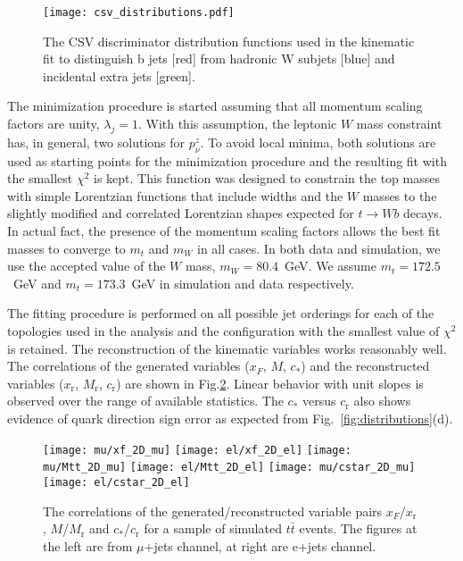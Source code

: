 \documentclass{cmspaperpdf}
\begin{document}
\begin{figure}[hbt]
  \begin{center}
    \texttt{[image: csv\_distributions.pdf]}
  \caption{\small The CSV discriminator distribution functions used in the kinematic fit to distinguish b jets [red] from hadronic W subjets [blue] and incidental extra jets [green].}
    \label{fig:CSV_distributions}
  \end{center}
\end{figure}

The minimization procedure is started assuming that all momentum scaling factors are unity, $\lambda_j=1$.  With this assumption, the leptonic $W$ mass constraint has, in general, two solutions for $p_\nu^z$.  To avoid local minima, both solutions are used as starting points for the minimization procedure and the resulting fit with the smallest $\chi^2$ is kept.  This function was designed to constrain the top masses with simple Lorentzian functions that include widths and the $W$ masses to the slightly modified and correlated Lorentzian shapes expected for $t\to Wb$ decays.  In actual fact, the presence of the momentum scaling factors allows the best fit masses to converge to $m_t$ and $m_W$ in all cases. In both data and simulation, we use the accepted value of the $W$ mass, $m_W = 80.4$~GeV. We assume $m_t=172.5$~GeV and $m_t=173.3$~GeV in simulation and data respectively.

The fitting procedure is performed on all possible jet orderings for each of the topologies used in the analysis and the configuration with the smallest value of $\chi^2$ is retained.  The reconstruction of the kinematic variables works reasonably well.  The correlations of the generated variables ($x_F$, $M$, $c_*$) and the reconstructed variables ($x_\mathrm{r}$, $M_\mathrm{r}$, $c_\mathrm{r}$) are shown in Fig.\ref{fig:cost_reco}.  Linear behavior with unit slopes is observed over the range of available statistics.  The $c_*$ versus $c_\mathrm{r}$ also shows evidence of quark direction sign error as expected from Fig.~\ref{fig:distributions}(d).  

\begin{figure}[hbt]
  \begin{center}
    \texttt{[image: mu/xf\_2D\_mu]}
    \texttt{[image: el/xf\_2D\_el]}   
    \texttt{[image: mu/Mtt\_2D\_mu]}
    \texttt{[image: el/Mtt\_2D\_el]}
    \texttt{[image: mu/cstar\_2D\_mu]}
    \texttt{[image: el/cstar\_2D\_el]}
  \caption{\small The correlations of the generated/reconstructed variable pairs $x_F$/$x_\mathrm{r}$ , $M$/$M_\mathrm{r}$ and $c_*$/$c_\mathrm{r}$ for a sample of simulated $t\bar t$ events. The figures at the left are from $\mu$+jets channel, at right are e+jets channel.}
    \label{fig:cost_reco}
  \end{center}
\end{figure}
\end{document}
